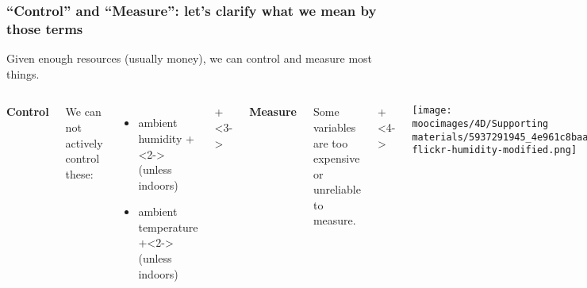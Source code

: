 \documentclass[handout,11pt,aspectratio=169,mathserif]{beamer}
\begin{document}
\begin{frame}\frametitle{``Control'' and ``Measure'': let's clarify what we mean by those terms}
	
	{\color{myOrange}Given enough resources (usually money), we can control and measure most things.}
	
	\begin{columns}[T]
			\begin{center}\textbf{Control}\end{center}
				
			We can not actively control these:
			\begin{itemize}
				\item	ambient humidity \onslide+<2->{(unless indoors)}
				\item	ambient temperature \onslide+<2->{(unless indoors)}
			\end{itemize}
			
			\vspace{1cm}
			
		
			\onslide+<3->{
				\begin{center}\textbf{Measure}\end{center}
			
				Some variables are too expensive or unreliable to measure.
			
				\onslide+<4->{
					\begin{center}
						\texttt{[image: \\moocimages/4D/Supporting materials/5937291945\_4e961c8baa\_o-flickr-humidity-modified.png]}
					\end{center}
				}
			}
			
	\end{columns}
	
\end{frame}
\end{document}
